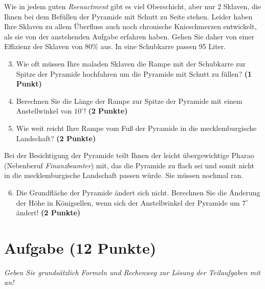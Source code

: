 \documentclass[a4paper, 9pt]{scrartcl}\usepackage[]{graphicx}\usepackage[]{xcolor}
\begin{document}
Wie in jedem guten \textit{Reenactment} gibt es viel Oberschicht, aber nur
2 Sklaven, die Ihnen bei dem Bef{\"u}llen der Pyramide mit Schutt
zu Seite stehen. Leider haben Ihre Sklaven zu allem {\"U}berfluss auch noch
chronische Knieschmerzen entwickelt, als sie von der
anstehenden Aufgabe erfahren haben. Gehen Sie daher von einer Effizienz der
Sklaven von 80\% aus. In eine Schubkarre passen
95 Liter.

\begin{enumerate}
  \setcounter{enumi}{2}
\item Wie oft m{\"u}ssen Ihre maladen Sklaven die Rampe mit der Schubkarre
  zur Spitze der Pyramide hochfahren um die Pyramide mit Schutt zu f{\"u}llen? \textbf{(1 Punkt)}
\item Berechnen Sie die L{\"a}nge der Rampe zur Spitze der Pyramide mit einem
  Anstellwinkel von $10^\circ$! \textbf{(2 Punkte)}
\item Wie weit reicht Ihre Rampe vom Fu{\ss} der Pyramide in die mecklemburgische
  Landschaft?  \textbf{(2 Punkte)}
\end{enumerate}

Bei der Besichtigung der Pyramide teilt Ihnen der leicht {\"u}bergewichtige
Pharao (Nebenberuf \textit{Finanzbeamter}) mit, das die Pyramide zu
flach sei und somit nicht in die mecklemburgische Landschaft passen
w{\"u}rde. Sie m{\"u}ssen nochmal ran.

\begin{enumerate}
  \setcounter{enumi}{5}
\item Die Grundfl{\"a}che der Pyramide {\"a}ndert sich nicht. Berechnen Sie die
  {\"A}nderung der H{\"o}he in K{\"o}nigsellen, wenn sich der Anstellwinkel der
  Pyramide um $7^\circ$ {\"a}ndert!  \textbf{(2 Punkte)}
\end{enumerate}



\clearpage

\section{Aufgabe \hfill (12 Punkte)}

\textit{Geben Sie grunds{\"a}tzlich Formeln und Rechenweg zur L{\"o}sung der
  Teilaufgaben mit an!} \\[1Ex]
\end{document}
